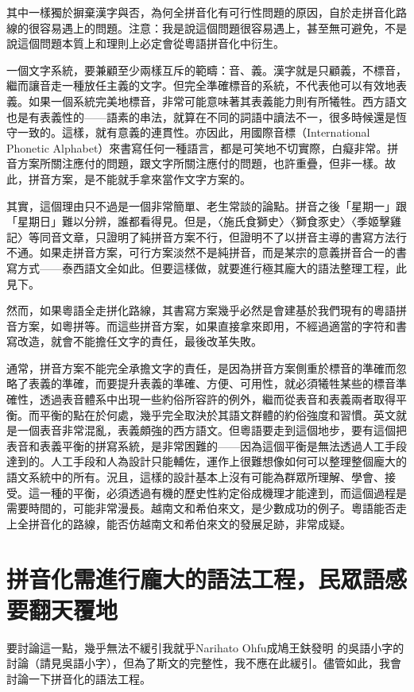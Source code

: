 \documentclass[a5paper, 12pt, openany]{book} %
\begin{document}
其中一樣獨於摒棄漢字與否，為何全拼音化有可行性問題的原因，自於走拼音化路線的很容易遇上的問題。注意：我是說這個問題很容易遇上，甚至無可避免，不是說這個問題本質上和理則上必定會從粵語拼音化中衍生。

一個文字系統，要兼顧至少兩樣互斥的範疇：音、義。漢字就是只顧義，不標音，繼而讓音走一種放任主義的文字。但完全準確標音的系統，不代表他可以有效地表義。如果一個系統完美地標音，非常可能意味著其表義能力則有所犧牲。西方語文也是有表義性的——語素的串法，就算在不同的詞語中讀法不一，很多時候還是恆守一致的。這樣，就有意義的連貫性。亦因此，用國際音標（International Phonetic Alphabet）來書寫任何一種語言，都是可笑地不切實際，白癡非常。拼音方案所關注應付的問題，跟文字所關注應付的問題，也許重疊，但非一樣。故此，拼音方案，是不能就手拿來當作文字方案的。

其實，這個理由只不過是一個非常簡單、老生常談的論點。拼音之後「星期一」跟「星期日」難以分辨，誰都看得見。但是，〈施氏食獅史〉〈獅食豕史〉〈季姬擊雞記〉等同音文章，只證明了純拼音方案不行，但證明不了以拼音主導的書寫方法行不通。如果走拼音方案，可行方案淡然不是純拼音，而是某宗的意義拼音合一的書寫方式——泰西語文全如此。但要這樣做，就要進行極其龐大的語法整理工程，此見下。

然而，如果粵語全走拼化路線，其書寫方案幾乎必然是會建基於我們現有的粵語拼音方案，如粵拼等。而這些拼音方案，如果直接拿來即用，不經過適當的字符和書寫改造，就會不能擔任文字的責任，最後改革失敗。

通常，拼音方案不能完全承擔文字的責任，是因為拼音方案側重於標音的準確而忽略了表義的準確，而要提升表義的準確、方便、可用性，就必須犧牲某些的標音準確性，透過表音體系中出現一些約俗所容許的例外，繼而從表音和表義兩者取得平衡。而平衡的點在於何處，幾乎完全取決於其語文群體的約俗強度和習慣。英文就是一個表音非常混亂，表義頗強的西方語文。但粵語要走到這個地步，要有這個把表音和表義平衡的拼寫系統，是非常困難的——因為這個平衡是無法透過人工手段達到的。人工手段和人為設計只能輔佐，運作上很難想像如何可以整理整個龐大的語文系統中的所有。況且，這樣的設計基本上沒有可能為群眾所理解、學會、接受。這一種的平衡，必須透過有機的歷史性約定俗成機理才能達到，而這個過程是需要時間的，可能非常漫長。越南文和希伯來文，是少數成功的例子。粵語能否走上全拼音化的路線，能否仿越南文和希伯來文的發展足跡，非常成疑。

\section{拼音化需進行龐大的語法工程，民眾語感要翻天覆地}

要討論這一點，幾乎無法不緩引我就乎Narihato Ohfu成鳩王鈇發明 的吳語小字的討論（請見吳語小字），但為了斯文的完整性，我不應在此緩引。儘管如此，我會討論一下拼音化的語法工程。
\end{document}
